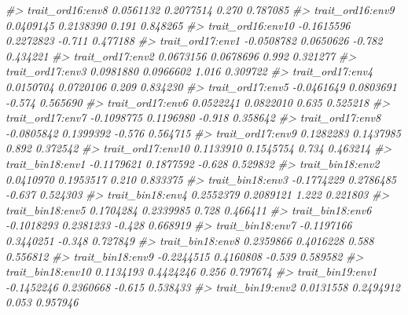 \documentclass[
]{article}
\newenvironment{Shaded}{\begin{snugshade}}{\end{snugshade}}
\newcommand{\CommentTok}[1]{\textcolor[rgb]{0.56,0.35,0.01}{\textit{#1}}}
\begin{document}
\begin{Shaded}
\begin{Highlighting}[]
\CommentTok{\#\textgreater{} trait\_ord16:env8               0.0561132  0.2077514   0.270 0.787085    }
\CommentTok{\#\textgreater{} trait\_ord16:env9               0.0409145  0.2138390   0.191 0.848265    }
\CommentTok{\#\textgreater{} trait\_ord16:env10             {-}0.1615596  0.2272823  {-}0.711 0.477188    }
\CommentTok{\#\textgreater{} trait\_ord17:env1              {-}0.0508782  0.0650626  {-}0.782 0.434221    }
\CommentTok{\#\textgreater{} trait\_ord17:env2               0.0673156  0.0678696   0.992 0.321277    }
\CommentTok{\#\textgreater{} trait\_ord17:env3               0.0981880  0.0966602   1.016 0.309722    }
\CommentTok{\#\textgreater{} trait\_ord17:env4               0.0150704  0.0720106   0.209 0.834230    }
\CommentTok{\#\textgreater{} trait\_ord17:env5              {-}0.0461649  0.0803691  {-}0.574 0.565690    }
\CommentTok{\#\textgreater{} trait\_ord17:env6               0.0522241  0.0822010   0.635 0.525218    }
\CommentTok{\#\textgreater{} trait\_ord17:env7              {-}0.1098775  0.1196980  {-}0.918 0.358642    }
\CommentTok{\#\textgreater{} trait\_ord17:env8              {-}0.0805842  0.1399392  {-}0.576 0.564715    }
\CommentTok{\#\textgreater{} trait\_ord17:env9               0.1282283  0.1437985   0.892 0.372542    }
\CommentTok{\#\textgreater{} trait\_ord17:env10              0.1133910  0.1545754   0.734 0.463214    }
\CommentTok{\#\textgreater{} trait\_bin18:env1              {-}0.1179621  0.1877592  {-}0.628 0.529832    }
\CommentTok{\#\textgreater{} trait\_bin18:env2               0.0410970  0.1953517   0.210 0.833375    }
\CommentTok{\#\textgreater{} trait\_bin18:env3              {-}0.1774229  0.2786485  {-}0.637 0.524303    }
\CommentTok{\#\textgreater{} trait\_bin18:env4               0.2552379  0.2089121   1.222 0.221803    }
\CommentTok{\#\textgreater{} trait\_bin18:env5               0.1704284  0.2339985   0.728 0.466411    }
\CommentTok{\#\textgreater{} trait\_bin18:env6              {-}0.1018293  0.2381233  {-}0.428 0.668919    }
\CommentTok{\#\textgreater{} trait\_bin18:env7              {-}0.1197166  0.3440251  {-}0.348 0.727849    }
\CommentTok{\#\textgreater{} trait\_bin18:env8               0.2359866  0.4016228   0.588 0.556812    }
\CommentTok{\#\textgreater{} trait\_bin18:env9              {-}0.2244515  0.4160808  {-}0.539 0.589582    }
\CommentTok{\#\textgreater{} trait\_bin18:env10              0.1134193  0.4424246   0.256 0.797674    }
\CommentTok{\#\textgreater{} trait\_bin19:env1              {-}0.1452246  0.2360668  {-}0.615 0.538433    }
\CommentTok{\#\textgreater{} trait\_bin19:env2               0.0131558  0.2494912   0.053 0.957946    }

\end{Highlighting}
\end{Shaded}
\end{document}
